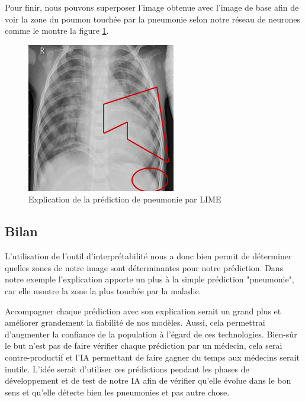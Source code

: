 Pour finir, nous pouvons superposer l'image obtenue avec l'image de base afin de voir la zone du poumon touchée par la pneumonie selon notre réseau de neurones comme le montre la figure \ref{limeFinalExplain}.

\newpage
\begin{figure}[h]
    \includegraphics[scale=0.7]{src_img/limeFinalExplain.png}
    \caption{Explication de la prédiction de pneumonie par LIME}
    \label{limeFinalExplain}
\end{figure}
\subsection{Bilan}
L'utilisation de l'outil d'interprétabilité nous a donc bien permit de déterminer quelles zones de notre image sont déterminantes pour notre prédiction. Dans notre exemple l'explication apporte un plus à la simple prédiction "pneumonie", car elle montre la zone la plus touchée par la maladie.\par
Accompagner chaque prédiction avec son explication serait un grand plus et améliorer grandement la fiabilité de nos modèles. Aussi, cela permettrai d'augmenter la confiance de la population à l'égard de ces technologies. Bien-sûr le but n'est pas de faire vérifier chaque prédiction par un médecin, cela serai contre-productif et l'IA permettant de faire gagner du temps aux médecins serait inutile. L'idée serait d'utiliser ces prédictions pendant les phases de développement et de test de notre IA afin de vérifier qu'elle évolue dans le bon sens et qu'elle détecte bien les pneumonies et pas autre chose.